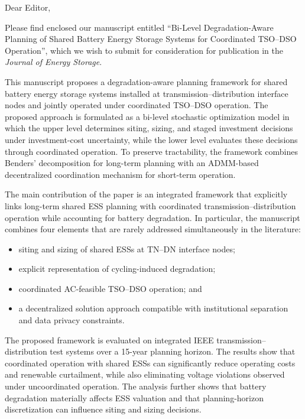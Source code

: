 \documentclass[12pt]{letter}
\begin{document}
\begin{letter}{}

    \opening{Dear Editor,}
    
    Please find enclosed our manuscript entitled ``Bi-Level Degradation-Aware Planning of Shared Battery Energy Storage Systems for Coordinated TSO--DSO Operation'', which we wish to submit for consideration for publication in the \textit{Journal of Energy Storage}.
    
    This manuscript proposes a degradation-aware planning framework for shared battery energy storage systems installed at transmission--distribution interface nodes and jointly operated under coordinated TSO--DSO operation. The proposed approach is formulated as a bi-level stochastic optimization model in which the upper level determines siting, sizing, and staged investment decisions under investment-cost uncertainty, while the lower level evaluates these decisions through coordinated operation. To preserve tractability, the framework combines Benders' decomposition for long-term planning with an ADMM-based decentralized coordination mechanism for short-term operation.
    
    The main contribution of the paper is an integrated framework that explicitly links long-term shared ESS planning with coordinated transmission--distribution operation while accounting for battery degradation. In particular, the manuscript combines four elements that are rarely addressed simultaneously in the literature:
    \begin{itemize}
        \item siting and sizing of shared ESSs at TN--DN interface nodes;
        \item explicit representation of cycling-induced degradation;
        \item coordinated AC-feasible TSO--DSO operation; and
        \item a decentralized solution approach compatible with institutional separation and data privacy constraints.
    \end{itemize}
    
    The proposed framework is evaluated on integrated IEEE transmission--distribution test systems over a 15-year planning horizon. The results show that coordinated operation with shared ESSs can significantly reduce operating costs and renewable curtailment, while also eliminating voltage violations observed under uncoordinated operation. The analysis further shows that battery degradation materially affects ESS valuation and that planning-horizon discretization can influence siting and sizing decisions.
    

\end{letter}
\end{document}
